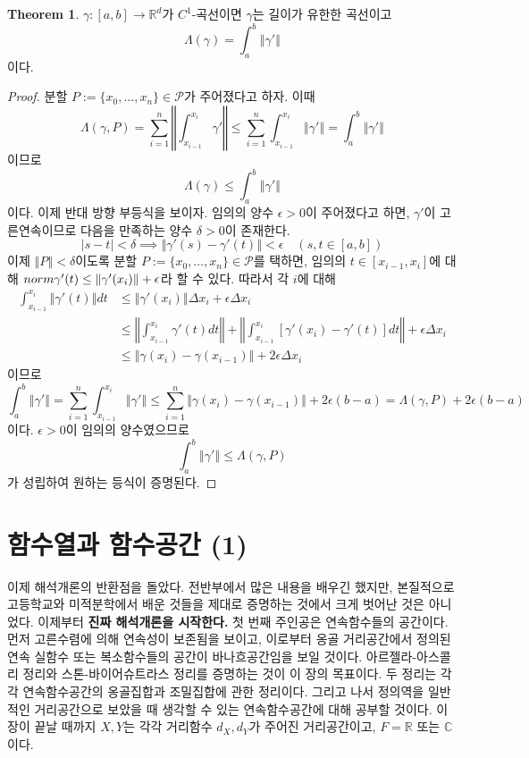 \documentclass[11pt]{book}
\numberwithin{equation}{chapter}
\def\RR{\mathbb{R}}
\def\CC{\mathbb{C}}
\def\eps{\epsilon}
\def\calP{\mathcal{P}}
\newcommand{\abs}[1]{\left\vert#1\right\vert}
\newcommand{\norm}[1]{\left\Vert#1\right\Vert}
\theoremstyle{definition}
\newtheorem{thm}{Theorem}[section]
\begin{document}
\begin{thm}
    \(\gamma : [a, b] \to \RR^d\)가 \(C^1\)-곡선이면 \(\gamma\)는 길이가 유한한 곡선이고
    \[
        \Lambda(\gamma) = \int_a^b \norm{\gamma'}
    \]
    이다.
\end{thm}
\begin{proof}
    분할 \(P := \{x_0, \ldots, x_n\} \in \calP\)가 주어졌다고 하자. 이때
    \[
        \Lambda(\gamma, P) = \sum_{i=1}^n \norm{\int_{x_{i-1}}^{x_i} \gamma'} \le \sum_{i=1}^n \int_{x_{i-1}}^{x_i} \norm{\gamma'} = \int_a^b \norm{\gamma'}
    \]
    이므로
    \[
        \Lambda(\gamma) \le \int_a^b \norm{\gamma'}
    \]
    이다. 이제 반대 방향 부등식을 보이자. 임의의 양수 \(\eps > 0\)이 주어졌다고 하면, \(\gamma'\)이 고른연속이므로 다음을 만족하는 양수 \(\delta > 0\)이 존재한다.
    \[
        \abs{s - t} < \delta \implies \norm{\gamma'(s) - \gamma'(t)} < \eps \quad (s, t \in [a, b])
    \]
    이제 \(\norm{P} < \delta\)이도록 분할 \(P := \{x_0, \ldots, x_n\} \in \calP\)를 택하면, 임의의 \(t \in [x_{i-1}, x_i]\)에 대해 \(\\norm{\gamma'(t)} \le \norm{\gamma'(x_i)} + \eps\)라 할 수 있다. 따라서 각 \(i\)에 대해
    \begin{align*}
        \int_{x_{i-1}}^{x_i} \norm{\gamma'(t)}dt &\le \norm{\gamma'(x_i)}\Delta x_i + \eps \Delta x_i\\
        &\le \norm{\int_{x_{i-1}}^{x_i} \gamma'(t)dt} + \norm{\int_{x_{i-1}}^{x_i} [\gamma'(x_i) - \gamma'(t)] dt} + \eps \Delta x_i\\
        &\le \norm{\gamma(x_i) - \gamma(x_{i-1})} + 2\eps\Delta x_i
    \end{align*}
    이므로
    \[
        \int_a^b \norm{\gamma'} = \sum_{i=1}^n \int_{x_{i-1}}^{x_i} \norm{\gamma'} \le \sum_{i=1}^n \norm{\gamma(x_i) - \gamma(x_{i-1})} + 2\eps(b-a) = \Lambda(\gamma, P) + 2\eps(b-a)
    \]
    이다. \(\eps > 0\)이 임의의 양수였으므로
    \[
        \int_a^b \norm{\gamma'} \le \Lambda(\gamma, P)
    \]
    가 성립하여 원하는 등식이 증명된다.
\end{proof}

\chapter{함수열과 함수공간 (1)}

이제 해석개론의 반환점을 돌았다. 전반부에서 많은 내용을 배우긴 했지만, 본질적으로 고등학교와 미적분학에서 배운 것들을 제대로 증명하는 것에서 크게 벗어난 것은 아니었다. 이제부터 \textbf{진짜 해석개론을 시작한다.} 첫 번째 주인공은 연속함수들의 공간이다. 먼저 고른수렴에 의해 연속성이 보존됨을 보이고, 이로부터 옹골 거리공간에서 정의된 연속 실함수 또는 복소함수들의 공간이 바나흐공간임을 보일 것이다. 아르젤라-아스콜리 정리와 스톤-바이어슈트라스 정리를 증명하는 것이 이 장의 목표이다. 두 정리는 각각 연속함수공간의 옹골집합과 조밀집합에 관한 정리이다. 그리고 나서 정의역을 일반적인 거리공간으로 보았을 때 생각할 수 있는 연속함수공간에 대해 공부할 것이다. 이 장이 끝날 때까지 \(X, Y\)는 각각 거리함수 \(d_X, d_Y\)가 주어진 거리공간이고, \(F = \RR\) 또는 \(\CC\)이다.
\end{document}
